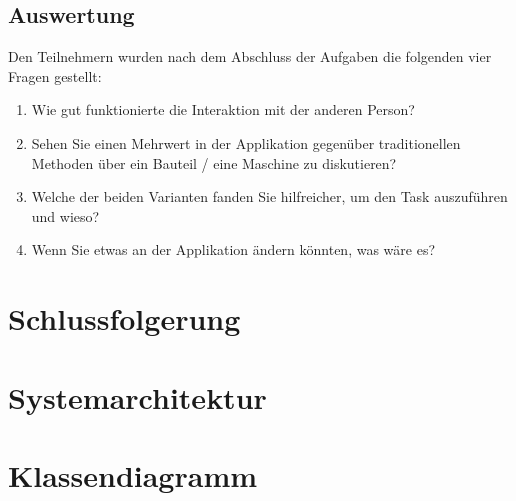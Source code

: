 \subsection{Auswertung}
Den Teilnehmern wurden nach dem Abschluss der Aufgaben die folgenden vier Fragen gestellt:

\begin{enumerate} [itemsep=1pt,topsep=0pt]
	\item Wie gut funktionierte die Interaktion mit der anderen Person?
	
	\item Sehen Sie einen Mehrwert in der Applikation gegenüber traditionellen Methoden über ein Bauteil / eine Maschine zu diskutieren?
	
	\item Welche der beiden Varianten fanden Sie hilfreicher, um den Task auszuführen und wieso?
	
	\item Wenn Sie etwas an der Applikation ändern könnten, was wäre es?
\end{enumerate}

\section{Schlussfolgerung}

\section{Systemarchitektur}

\section{Klassendiagramm}